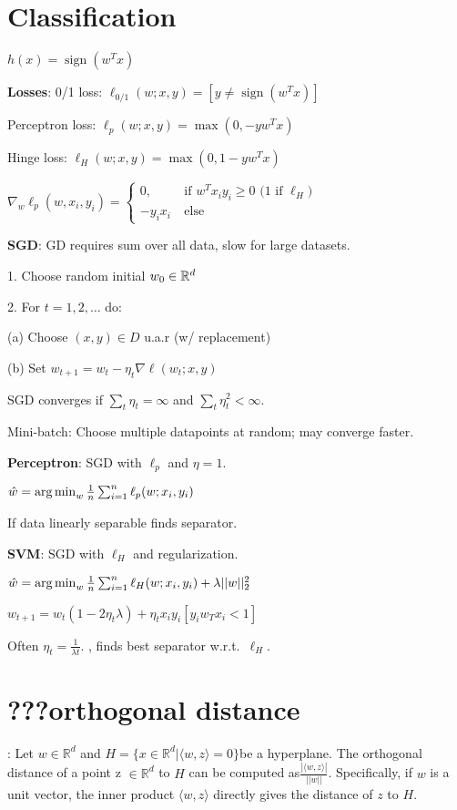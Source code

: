 \section{Classification}
$h(x) = \operatorname{sign}(w^T x)$

\textbf{Losses}: 0/1 loss: $\ell_{0/1}(w; x, y) = [y \neq  \operatorname{sign}(w^T x)]$

Perceptron loss: $\ell_p(w; x, y) = \max(0, -yw^Tx)$

Hinge loss: $\ell_H(w; x, y) = \max(0, 1-yw^Tx)$

$ \nabla_w \ell_p(w, x_i, y_i) = \begin{cases} 0,&\ \text{if $w^T x_i y_i \geq 0$ ($1$ if $\ell_H$)} \\ -y_i x_i&\ \text{else}\end{cases}$

\textbf{SGD}: GD requires sum over all data, slow for large datasets.

1. Choose random initial $w_0 \in \mathbb{R}^d$

2. For $t = 1, 2, \dots$ do:

(a) Choose $(x, y) \in D$ u.a.r (w/ replacement)

(b) Set $w_{t+1} = w_t - \eta_t \nabla \ell(w_t; x, y)$

SGD converges if $\sum_t \eta_t = \infty$ and $\sum_t \eta_t^2 < \infty$.

Mini-batch: Choose multiple datapoints at random; may converge
faster.

\textbf{Perceptron}: SGD with $\ell_p$ and $\eta = 1$.

$\hat{w} =\operatorname*{arg\,min}_w \frac{1}{n} \sum_{i=1}^n \ell_p(w; x_i, y_i)$

If data linearly separable finds separator.

\textbf{SVM}: SGD with $\ell_H$ and regularization.

$\hat{w} =\operatorname*{arg\,min}_w \frac{1}{n} \sum_{i=1}^n \ell_H(w; x_i, y_i) + \lambda ||w||_2^2$

$w_{t+1} = w_t (1 - 2 \eta_t \lambda) + \eta_t x_i y_i [y_i w_T x_i < 1]$ 

Often $\eta_t = \frac{1}{\lambda t}$. , finds best
separator w.r.t.\ $\ell_H$.

\section{???orthogonal distance}: Let $ w \in \mathbb{R}^d $ and $H = \{ x \in \mathbb{R}^d | \langle w , z \rangle = 0 \} $be a hyperplane. The orthogonal distance of a point z $\in \mathbb{R}^d$ to $H$ can be computed as$ \frac{|\langle w, z \rangle |}{||w||}$. Specifically, if $w$ is a unit vector, the inner product $\langle w, z \rangle$ directly gives the distance of $z$ to $H$.